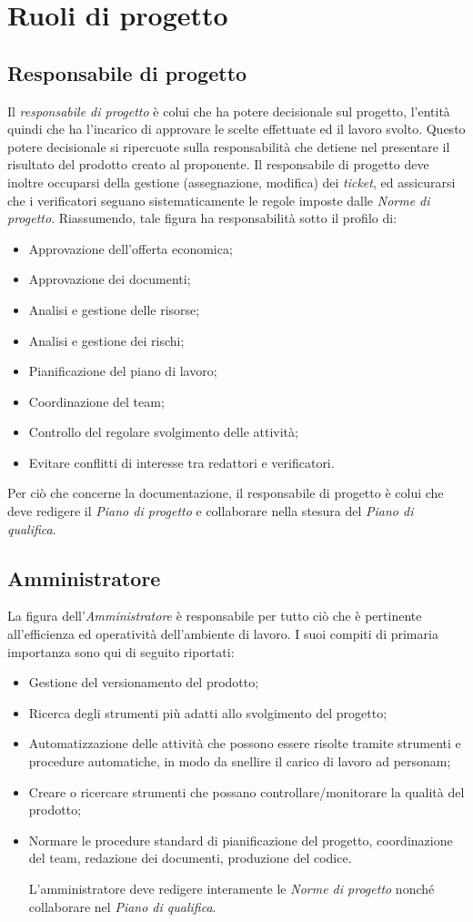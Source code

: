 \section{Ruoli di progetto}
\subsection{Responsabile di progetto}
\label{referenzaRDP}
Il \textit{responsabile di progetto} è colui che ha potere decisionale sul progetto, l'entità quindi che ha l'incarico di approvare le scelte effettuate ed il lavoro svolto. Questo potere decisionale si ripercuote sulla responsabilità che detiene nel presentare il risultato del prodotto creato al proponente.
Il responsabile di progetto deve inoltre occuparsi della gestione (assegnazione, modifica) dei \textit{ticket}, ed assicurarsi che i verificatori seguano sistematicamente le regole imposte dalle \textit{Norme di progetto}.
Riassumendo, tale figura ha responsabilità sotto il profilo di:
\begin{itemize}
\item Approvazione dell'offerta economica;
\item Approvazione dei documenti;
\item Analisi e gestione delle risorse;
\item Analisi e gestione dei rischi;
\item Pianificazione del piano di lavoro;
\item Coordinazione del team;
\item Controllo del regolare svolgimento delle attività;
\item Evitare conflitti di interesse tra redattori e verificatori.
\end{itemize}
Per ciò che concerne la documentazione, il responsabile di progetto è colui che deve redigere il \textit{Piano di progetto} e collaborare nella stesura del \textit{Piano di qualifica}.
\subsection{Amministratore}
La figura dell'\textit{Amministratore} è responsabile per tutto ciò che è pertinente all'efficienza ed operatività dell'ambiente di lavoro. 
I suoi compiti di primaria importanza sono qui di seguito riportati:
\begin{itemize}
\item Gestione del versionamento del prodotto;
\item Ricerca degli strumenti più adatti allo svolgimento del progetto;
\item Automatizzazione delle attività che possono essere risolte tramite strumenti e procedure automatiche, in modo da snellire il carico di lavoro ad personam;
\item Creare o ricercare strumenti che possano controllare/monitorare la qualità del prodotto;
\item Normare le procedure standard di pianificazione del progetto, coordinazione del team, redazione dei documenti, produzione del codice.

L'amministratore deve redigere interamente le \textit{Norme di progetto} nonché collaborare nel \textit{Piano di qualifica}.
\end{itemize}
